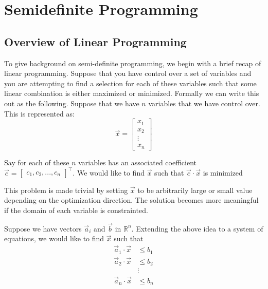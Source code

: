 \documentclass{article}
\begin{document}
\section{Semidefinite Programming}  %

\subsection{Overview of Linear Programming}
To give background on semi-definite programming, we begin with a brief recap of linear programming.
Suppose that you have control over a set of variables and you are attempting to find a selection for each of these variables such that some linear combination is either maximized or minimized.
Formally we can write this out as the following. Suppose that we have \( n \) variables that we have control over. This is represented as:
\[
\vec{x} = \begin{bmatrix} x_1 \\ x_2 \\ \vdots \\ x_n \end{bmatrix}
\]

Say for each of these \( n \) variables has an associated coefficient \( \vec{c} = \begin{bmatrix} c_1, c_2, ..., c_n  \end{bmatrix}^\top \).
We would like to find \( \vec{x} \) such that \( \vec{c} \cdot \vec{x} \) is minimized

This problem is made trivial by setting \( \vec{x} \) to be arbitrarily large or small value depending on the optimization direction.
The solution becomes more meaningful if the domain of each variable is constrainted.


Suppose we have vectors \( \vec{a}_i \) and \( \vec{b} \) in $\mathbb{R}^n$.
Extending the above idea to a system of equations, we would like to find \( \vec{x} \) such that
\begin{align*}
\vec{a}_1 \cdot \vec{x} &\leq b_1 \\
\vec{a}_2 \cdot \vec{x} &\leq b_2 \\
& \vdots  \\
\vec{a}_n \cdot \vec{x} &\leq b_n \\
\end{align*}
\end{document}
